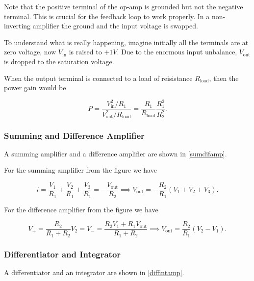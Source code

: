 \documentclass[english,a4paper,12pt]{report}
\begin{document}
Note that the positive terminal of the op-amp is grounded but not the negative terminal. This is crucial for the feedback loop to work properly. In a non-inverting amplifier the ground and the input voltage is swapped.

To understand what is really happening, imagine initially all the terminals are at zero voltage, now \(V_{\text{in}} \) is raised to \(+1V\). Due to the enormous input unbalance, \(V_{\text{out}} \) is dropped to the saturation voltage.

When the output terminal is connected to a load of reisistance \(R_{\text{load} } \), then the power gain would be 

\begin{equation}
    P = \frac{V_{\text{in} }^2 /R_{1 }  }{V_{\text{out} }^2/ R_{\text{load} }  } = \frac{R_{1} }{R_{\text{load} } } \frac{R_{1}^2 }{R_{2}^2 }.  
\end{equation}

\subsubsection{Summing and Difference Amplifier}

A summing amplifier and a difference amplifier are shown in \cref{sumdifamp}.

For the summing amplifier from the figure we have 

\begin{equation}
    i = \frac{V_1 }{R_1 } + \frac{V_2 }{R_1 } + \frac{V_3 }{R_1 } = -\frac{V_{\text{out} } }{R_2 } \implies V_{\text{out} } = -\frac{R_2 }{R_1 } (V_1 +V_2 +V_3 ).    
\end{equation}

For the difference amplifier from the figure we have 

\begin{equation}
    V_{+} = \frac{R_2 }{R_1 +R_2 }V_2 = V_{-} = \frac{R_2 V_1 +R_1 V_{\text{out} } }{R_1 +R_2 } \implies V_{\text{out} } = \frac{R_2 }{R_1 }(V_2 -V_1 ).     
\end{equation}


\subsubsection{Differentiator and Integrator}

A differentiator and an integrator are shown in \cref{diffintamp}.
\end{document}
